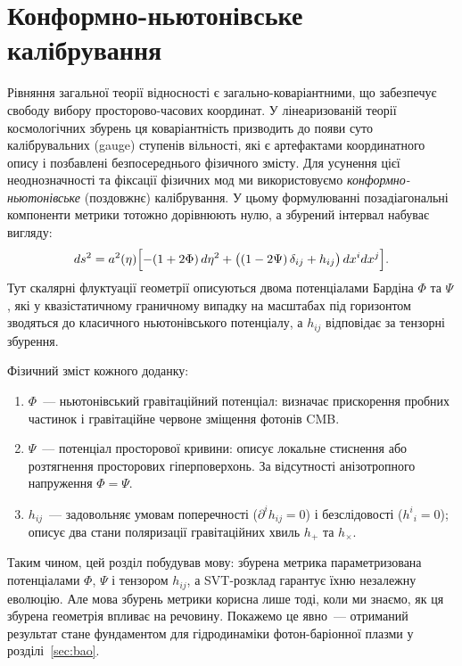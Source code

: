 \section{Конформно-ньютонівське калібрування}

Рівняння загальної теорії відносності є загально-коваріантними, що забезпечує
свободу вибору просторово-часових координат. У лінеаризованій теорії
космологічних збурень ця коваріантність призводить до появи суто
калібрувальних (gauge) ступенів вільності, які є артефактами координатного
опису і позбавлені безпосереднього фізичного змісту. Для усунення цієї
неоднозначності та фіксації фізичних мод ми використовуємо
\emph{конформно-ньютонівське} (поздовжнє) калібрування. У цьому формулюванні
позадіагональні компоненти метрики тотожно дорівнюють нулю, а збурений
інтервал набуває вигляду:
\begin{equation}\label{eq:perturbed_metric}
  ds^2 = a^2(\eta)\Bigl[
    -(1 + 2\Phi)\,d\eta^2
    + \bigl((1 - 2\Psi)\,\delta_{ij} + h_{ij}\bigr)\,dx^i dx^j
  \Bigr].
\end{equation}
Тут скалярні флуктуації геометрії описуються двома потенціалами
Бардіна $\Phi$ та $\Psi$ \cite{bardeen_1980}, які у квазістатичному
граничному випадку на масштабах під горизонтом зводяться до класичного
ньютонівського потенціалу, а $h_{ij}$ відповідає за тензорні збурення.

Фізичний зміст кожного доданку:
\begin{enumerate}
  \item $\Phi$~--- ньютонівський гравітаційний потенціал:
        визначає прискорення пробних частинок і гравітаційне
        червоне зміщення фотонів CMB.
  \item $\Psi$~--- потенціал просторової кривини: описує
        локальне стиснення або розтягнення просторових
        гіперповерхонь. За відсутності анізотропного напруження
        $\Phi = \Psi$.
  \item $h_{ij}$~--- задовольняє умовам поперечності
        ($\partial^i h_{ij} = 0$) і безслідовості
        ($h^i{}_i = 0$); описує два стани поляризації
        гравітаційних хвиль $h_+$ та $h_\times$.
\end{enumerate}

Таким чином, цей розділ побудував мову: збурена метрика
параметризована потенціалами $\Phi$, $\Psi$ і тензором $h_{ij}$,
а SVT-розклад гарантує їхню незалежну еволюцію. Але мова збурень
метрики корисна лише тоді, коли ми знаємо, як ця збурена геометрія
впливає на речовину. Покажемо це явно~--- отриманий результат стане
фундаментом для гідродинаміки фотон-баріонної плазми у
розділі~\ref{sec:bao}.

